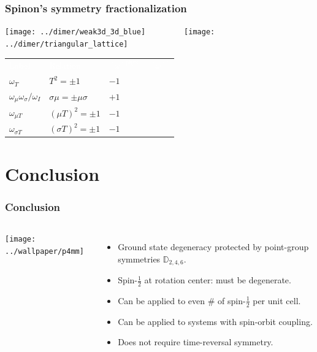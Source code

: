 \documentclass[xcolor=table, 10pt, aspectratio=169]{beamer}
\renewcommand{\arraystretch}{1.5}
\begin{document}
\begin{frame}
  \frametitle{Spinon's symmetry fractionalization}
  \centering \texttt{[image: ../dimer/weak3d\_3d\_blue]}~~~~~~~~~\texttt{[image: ../dimer/triangular\_lattice]}
  \begin{table}
    \centering
    \renewcommand{\arraystretch}{1.5}
    \begin{tabularx}{.8\columnwidth}{xxx}
      \textcolor{white}{Label}
      &\textcolor{white}{Relation}
      & \textcolor{white}{$[\omega]^{\text{phys}}=[\omega]^e$}\\
      $\omega_T$ & $T^2=\pm1$ & $-1$\\
      $\omega_\mu\omega_\sigma/\omega_I$
      & $\sigma\mu=\pm\mu\sigma$ & $+1$ \\
      $\omega_{\mu T}$ & $(\mu T)^2=\pm1$ & $-1$ \\
      $\omega_{\sigma T}$ & $(\sigma T)^2=\pm1$ & $-1$
    \end{tabularx}
  \end{table}
\end{frame}

\section{Conclusion}

\begin{frame}
  \frametitle{Conclusion}
  \begin{columns}
    \begin{center}
      \texttt{[image: ../wallpaper/p4mm]}
    \end{center}
    \begin{itemize}
      \item Ground state degeneracy protected by point-group symmetries $\mathbb D_{2,4,6}$.
      \item Spin-$\frac12$ at rotation center: must be degenerate.
      \item Can be applied to even \# of spin-$\frac12$ per unit cell.
      \item Can be applied to systems with spin-orbit coupling.
      \item Does not require time-reversal symmetry.
    \end{itemize}
  \end{columns}
\end{frame}
\end{document}
